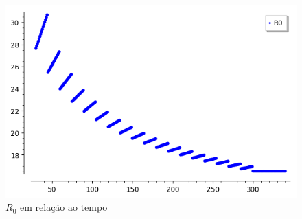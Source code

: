 \documentclass{article}
\begin{document}
\begin{figure}[H]
    \centering
    \includegraphics[scale = 0.7]{Imagens/R0.png}
    \caption{$R_0$ em relação ao tempo}
    \label{R0}
\end{figure}
\end{document}
